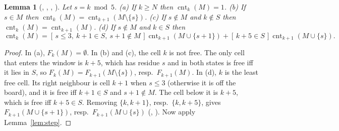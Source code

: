 \documentclass[11pt]{amsart}
\theoremstyle{plain}
\newtheorem{lemma}[theorem]{Lemma}
\theoremstyle{definition}
\newcommand{\ib}[1]{[\,#1\,]}
\newcommand{\cnt}{\operatorname{cnt}}
\begin{document}
\begin{lemma}[, , , ]\label{lem:cnt}
Let $s=k\bmod5$. (a) If $k\ge N$ then $\cnt_k(M)=1$. (b) If $s\in M$ then $\cnt_k(M)=\cnt_{k+1}(M\setminus\{s\})$. (c) If $s\notin M$ and $k\notin S$ then $\cnt_k(M)=\cnt_{k+1}(M)$. (d) If $s\notin M$ and $k\in S$ then
\[\cnt_k(M)=\ib{s\le3,\ k+1\in S,\ s+1\notin M}\cnt_{k+1}(M\cup\{s+1\})+\ib{k+5\in S}\cnt_{k+1}(M\cup\{s\}).\]
\end{lemma}

\begin{proof}
In (a), $F_k(M)=\emptyset$. In (b) and (c), the cell $k$ is not free. The only cell that enters the window is $k+5$, which has residue $s$ and in both states is free iff it lies in $S$, so $F_k(M)=F_{k+1}(M\setminus\{s\})$, resp.\ $F_{k+1}(M)$. In (d), $k$ is the least free cell. Its right neighbour is cell $k+1$ when $s\le3$ (otherwise it is off the board), and it is free iff $k+1\in S$ and $s+1\notin M$. The cell below it is $k+5$, which is free iff $k+5\in S$. Removing $\{k,k+1\}$, resp.\ $\{k,k+5\}$, gives $F_{k+1}(M\cup\{s+1\})$, resp.\ $F_{k+1}(M\cup\{s\})$ (, ). Now apply Lemma~\ref{lem:step}.
\end{proof}
\end{document}
